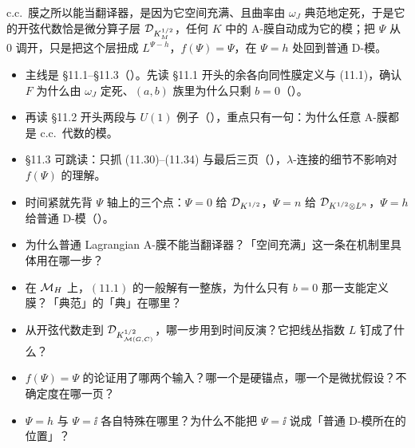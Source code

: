 \begin{keybox}
c.c.\ 膜之所以能当翻译器，是因为它空间充满、且曲率由 $\omega_J$ 典范地定死，于是它的开弦代数恰是微分算子层 $\mathcal{D}_{K_M^{1/2}}$，任何 $K$ 中的 A-膜自动成为它的模；把 $\Psi$ 从 $0$ 调开，只是把这个层扭成 $L^{\Psi-h}$，$f(\Psi)=\Psi$，在 $\Psi=h$ 处回到普通 D-模。
\end{keybox}

\begin{follow}
\begin{itemize}
\item 主线是 \S11.1--\S11.3（）。先读 \S11.1 开头的余各向同性膜定义与 (11.1)，确认 $F$ 为什么由 $\omega_J$ 定死、$(a,b)$ 族里为什么只剩 $b=0$（）。
\item 再读 \S11.2 开头两段与 $U(1)$ 例子（），重点只有一句：为什么任意 A-膜都是 c.c.\ 代数的模。
\item \S11.3 可跳读：只抓 (11.30)--(11.34) 与最后三页（），$\lambda$-连接的细节不影响对 $f(\Psi)$ 的理解。
\item 时间紧就先背 $\Psi$ 轴上的三个点：$\Psi=0$ 给 $\mathcal{D}_{K^{1/2}}$，$\Psi=n$ 给 $\mathcal{D}_{K^{1/2}\otimes L^n}$，$\Psi=h$ 给普通 D-模（）。
\end{itemize}
\end{follow}

\begin{checkbox}
\begin{itemize}
\item 为什么普通 Lagrangian A-膜不能当翻译器？「空间充满」这一条在机制里具体用在哪一步？
\item 在 $\mathcal{M}_{H}$ 上，$(11.1)$ 的一般解有一整族，为什么只有 $b=0$ 那一支能定义膜？「典范」的「典」在哪里？
\item 从开弦代数走到 $\mathcal{D}_{K_{\mathcal{M}(G,C)}^{1/2}}$，哪一步用到时间反演？它把线丛指数 $L$ 钉成了什么？
\item $f(\Psi)=\Psi$ 的论证用了哪两个输入？哪一个是硬锚点，哪一个是微扰假设？不确定度在哪一页？
\item $\Psi=h$ 与 $\Psi=\ii$ 各自特殊在哪里？为什么不能把 $\Psi=\ii$ 说成「普通 D-模所在的位置」？
\end{itemize}
\end{checkbox}
